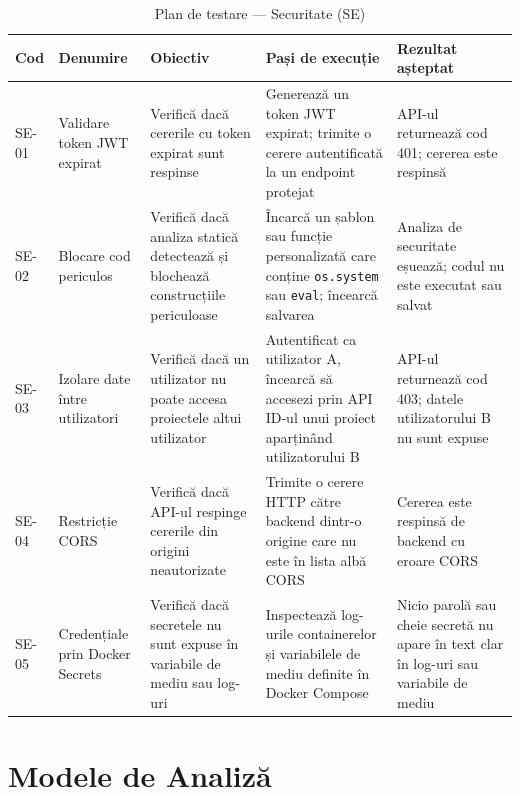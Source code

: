 \documentclass[../../main.tex]{subfiles}
\begin{document}
    \begin{table}[H]
        \centering
        \footnotesize
        \begin{tabular}{|p{}|p{}|p{}|p{}|p{}|}
            \hline
            \textbf{Cod} & \textbf{Denumire} & \textbf{Obiectiv} & \textbf{Pași de execuție} & \textbf{Rezultat așteptat} \\
            \hline
            SE-01 & Validare token JWT expirat & Verifică dacă cererile cu token expirat sunt respinse & Generează un token JWT expirat; trimite o cerere autentificată la un endpoint protejat & API-ul returnează cod 401; cererea este respinsă \\
            \hline
            SE-02 & Blocare cod periculos & Verifică dacă analiza statică detectează și blochează construcțiile periculoase & Încarcă un șablon sau funcție personalizată care conține \texttt{os.system} sau \texttt{eval}; încearcă salvarea & Analiza de securitate eșuează; codul nu este executat sau salvat \\
            \hline
            SE-03 & Izolare date între utilizatori & Verifică dacă un utilizator nu poate accesa proiectele altui utilizator & Autentificat ca utilizator A, încearcă să accesezi prin API ID-ul unui proiect aparținând utilizatorului B & API-ul returnează cod 403; datele utilizatorului B nu sunt expuse \\
            \hline
            SE-04 & Restricție CORS & Verifică dacă API-ul respinge cererile din origini neautorizate & Trimite o cerere HTTP către backend dintr-o origine care nu este în lista albă CORS & Cererea este respinsă de backend cu eroare CORS \\
            \hline
            SE-05 & Credențiale prin Docker Secrets & Verifică dacă secretele nu sunt expuse în variabile de mediu sau log-uri & Inspectează log-urile containerelor și variabilele de mediu definite în Docker Compose & Nicio parolă sau cheie secretă nu apare în text clar în log-uri sau variabile de mediu \\
            \hline
        \end{tabular}
        \caption{Plan de testare --- Securitate (SE)}
        \label{tab:test_se}
    \end{table}

    \section{Modele de Analiză}
\end{document}
